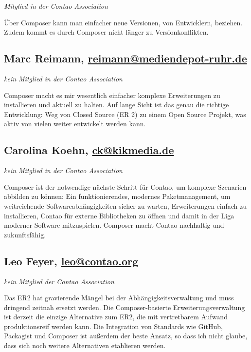 \documentclass[
paper=a4,
draft=false,%
fontsize=10pt%
]{scrartcl}
\begin{document}
\emph{Mitglied in der Contao Association}

Über Composer kann man einfacher neue Versionen, von Entwicklern, beziehen.  Zudem kommt es durch Composer nicht länger zu Versionkonflikten.

\subsection*{Marc  Reimann, \href{mailto:reimann@mediendepot-ruhr.de}{reimann@mediendepot-ruhr.de}}

\emph{kein Mitglied in der Contao Association}

Composer macht es mir wesentlich einfacher komplexe Erweiterungen zu installieren und aktuell zu halten. Auf lange Sicht ist das genau die richtige Entwicklung: Weg von Closed Source (ER 2) zu einem Open Source Projekt, was aktiv von vielen weiter entwickelt werden kann.

\subsection*{Carolina  Koehn, \href{mailto:ck@kikmedia.de}{ck@kikmedia.de}}

\emph{kein Mitglied in der Contao Association}

Composer ist der notwendige nächste Schritt für Contao, um komplexe Szenarien abbilden zu können: Ein funktionierendes, modernes  Paketmanagement, um weitreichende Softwareabhängigkeiten sicher zu warten, Erweiterungen einfach zu installieren, Contao für externe Bibliotheken zu öffnen und damit in der Liga moderner Software mitzuspielen. Composer macht Contao nachhaltig und zukunftsfähig.

\subsection*{Leo  Feyer, \href{mailto:leo@contao.org}{leo@contao.org}}

\emph{kein Mitglied der Contao Association}

Das ER2 hat gravierende Mängel bei der Abhängigkeitsverwaltung und muss dringend zeitnah ersetzt werden. Die Composer-basierte Erweiterungsverwaltung ist derzeit die einzige Alternative zum ER2, die mit vertretbarem Aufwand produktionsreif werden kann. Die Integration von Standards wie GitHub, Packagist und Composer ist außerdem der beste Ansatz, so dass ich nicht glaube, dass sich noch weitere Alternativen etablieren werden.
\end{document}
